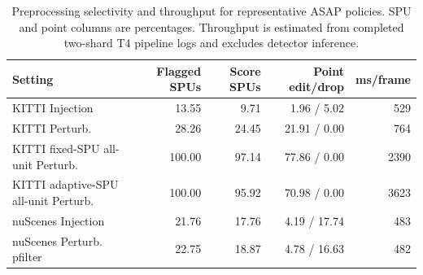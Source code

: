 \begin{table}[t]
\centering
\scriptsize
\setlength{\tabcolsep}{3.5pt}
\caption{Preprocessing selectivity and throughput for representative ASAP policies. SPU and point columns are percentages. Throughput is estimated from completed two-shard T4 pipeline logs and excludes detector inference.}
\label{tab:cost_selectivity}
\begin{tabular}{lrrrr}
\toprule
Setting & Flagged SPUs & Score SPUs & Point edit/drop & ms/frame \\
\midrule
KITTI Injection & 13.55 & 9.71 & 1.96 / 5.02 & 529 \\
KITTI Perturb. & 28.26 & 24.45 & 21.91 / 0.00 & 764 \\
KITTI fixed-SPU all-unit Perturb. & 100.00 & 97.14 & 77.86 / 0.00 & 2390 \\
KITTI adaptive-SPU all-unit Perturb. & 100.00 & 95.92 & 70.98 / 0.00 & 3623 \\
nuScenes Injection & 21.76 & 17.76 & 4.19 / 17.74 & 483 \\
nuScenes Perturb. pfilter & 22.75 & 18.87 & 4.78 / 16.63 & 482 \\
\bottomrule
\end{tabular}
\end{table}
